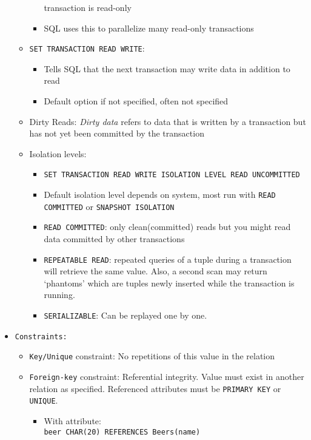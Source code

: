 \documentclass[landscape,8pt]{extarticle}
\newcommand{\code}{\lstinline}
\begin{document}
\begin{multicols}{4}
\begin{itemize}
\begin{itemize}
\begin{itemize}
        transaction is read-only
        \item SQL uses this to parallelize many read-only transactions
    \end{itemize}
    \item \code{SET TRANSACTION READ WRITE}:
    \begin{itemize}
        \item Tells SQL that the next transaction may write data in addition to read
        \item Default option if not specified, often not specified
    \end{itemize}
    \item Dirty Reads: \emph{Dirty data} refers to data that is written by a transaction but has not
    yet been committed by the transaction
    \item Isolation levels:
    \begin{itemize}
        \item \code{SET TRANSACTION READ WRITE ISOLATION LEVEL READ UNCOMMITTED}
        \item Default isolation level depends on system, most run with \code{READ COMMITTED} or \code{SNAPSHOT ISOLATION}
        \item \code{READ COMMITTED}: only clean(committed) reads but you might read data committed
        by other transactions
        \item \code{REPEATABLE READ}: repeated queries of a tuple during a transaction will retrieve
        the same value. Also, a second scan may return `phantoms' which are tuples newly inserted
        while the transaction is running.
        \item \code{SERIALIZABLE}: Can be replayed one by one.
    \end{itemize}
\end{itemize}
    \item \code{Constraints:}
    \begin{itemize}
        \item \code{Key/Unique} constraint: No repetitions of this value in the relation
        \item \code{Foreign-key} constraint: Referential integrity. Value must exist in another
        relation as specified. Referenced attributes must be \code{PRIMARY KEY} or \code{UNIQUE}.
        \begin{itemize}
            \item With attribute:\\
            \code{beer CHAR(20) REFERENCES Beers(name)}

\end{itemize}
\end{itemize}
\end{itemize}
\end{multicols}
\end{document}
